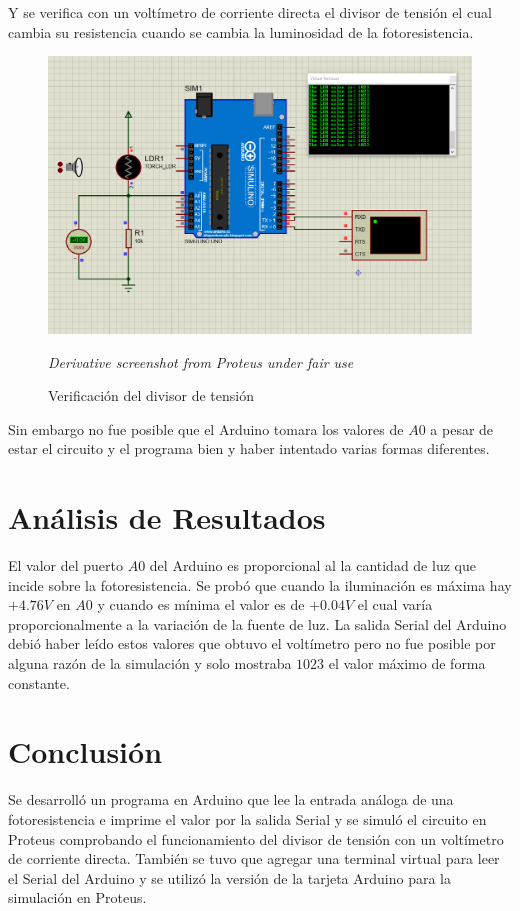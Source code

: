 \documentclass{article}
\begin{document}
Y se verifica con un voltímetro de corriente directa el divisor de tensión el
cual cambia su resistencia cuando se cambia la luminosidad de la
fotoresistencia.

\begin{figure}[H]
\centering
\includegraphics[width=0.3\paperwidth]{images/sim-2}
\caption{Verificación del divisor de tensión}\footnotesize
\textit{Derivative screenshot from Proteus under fair use}
\end{figure}

Sin embargo no fue posible que el Arduino tomara los valores de $A0$ a pesar
de estar el circuito y el programa bien y haber intentado varias formas
diferentes.

\section{Análisis de Resultados}

El valor del puerto $A0$ del Arduino es proporcional al la cantidad de luz
que incide sobre la fotoresistencia. Se probó que cuando la iluminación es
máxima hay $+4.76V$ en $A0$ y cuando es mínima el valor es de $+0.04V$ el
cual varía proporcionalmente a la variación de la fuente de luz. La salida
Serial del Arduino debió haber leído estos valores que obtuvo el voltímetro
pero no fue posible por alguna razón de la simulación y solo mostraba $1023$
el valor máximo de forma constante.

\section{Conclusión}

Se desarrolló un programa en Arduino que lee la entrada análoga de una
fotoresistencia e imprime el valor por la salida Serial y se simuló el
circuito en Proteus comprobando el funcionamiento del divisor de tensión con
un voltímetro de corriente directa. También se tuvo que agregar una terminal
virtual para leer el Serial del Arduino y se utilizó la versión
 de la tarjeta Arduino para la simulación en Proteus.

\printbibliography
\end{document}

